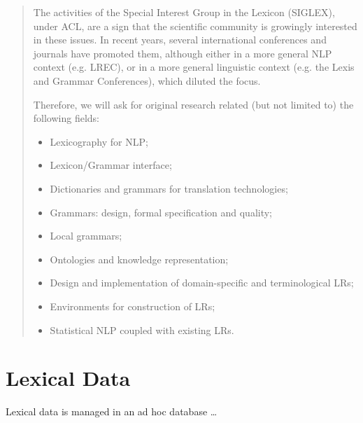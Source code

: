 \documentclass[11pt]{article}
\begin{document}
\begin{quote}
The activities of the Special Interest Group in the Lexicon (SIGLEX), under ACL, are a sign  that the scientific community is growingly interested in these issues. In recent years, several international conferences and journals have promoted them, although either in a more general NLP context (e.g. LREC), or in a more general linguistic context (e.g. the Lexis and Grammar Conferences), which diluted the focus.

Therefore, we will ask for original research related (but not limited to) the following fields:
\begin{itemize}
\item Lexicography for NLP;
\item Lexicon/Grammar interface;
\item Dictionaries and grammars for translation technologies;
\item Grammars: design, formal specification and quality;
\item Local grammars;
\item Ontologies and knowledge representation;
\item Design and implementation of domain-specific and terminological LRs;
\item Environments for construction of LRs;
\item Statistical NLP coupled with existing LRs.
\end{itemize}
\end{quote}

\section{Lexical Data}

Lexical data is managed in an ad hoc database \ldots
\end{document}
